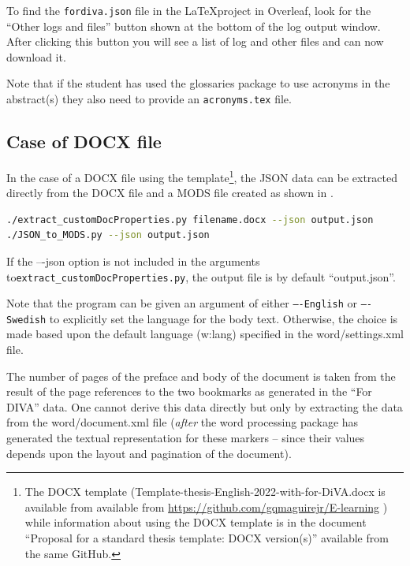 To find the \texttt{fordiva.json} file in the \LaTeX project in Overleaf, look for the “Other logs and files” button shown at the bottom of the log output window. After clicking this button you will see a list of log and other files and can now download it.

Note that if the student has used the glossaries package to use acronyms in the abstract(s) they also need to provide an \texttt{acronyms.tex} file.


\subsection{Case of DOCX file}
\label{sec:extractingJSONDOCX}
In the case of a DOCX file using the template\footnote{The DOCX template (\eg Template-thesis-English-2022-with-for-DiVA.docx is available from available from \url{https://github.com/gqmaguirejr/E-learning} ) while information about using the DOCX template is in the document ``Proposal for a standard thesis template: DOCX version(s)'' available from the same GitHub.}, the JSON data can be extracted directly from the DOCX file and a MODS file created as shown in .
\begin{lstlisting}[basicstyle=\footnotesize, language={bash}, caption={Extract field values from the DOCX file and then make a MODS file},label=lst:extractDOCX]
./extract_customDocProperties.py filename.docx --json output.json
./JSON_to_MODS.py --json output.json
\end{lstlisting}
If the –-json option is not included in the arguments to\linebreak[4] \texttt{extract\_customDocProperties.py}, the output file is by default “output.json”.

Note that the program can be given an argument of either \texttt{\hbox{–-English}} or \texttt{\hbox{–-Swedish}} to explicitly set the language for the body text. Otherwise, the choice is made based upon the default language (w:lang) specified in the word/settings.xml file.


The number of pages of the preface and body of the document is taken from the result of the page references to the two bookmarks as generated in the “For DIVA” data. One cannot derive this data directly but only by extracting the data from the word/document.xml file (\textit{after} the word processing package has generated the textual representation for these markers – since their values depends upon the layout and pagination of the document).

